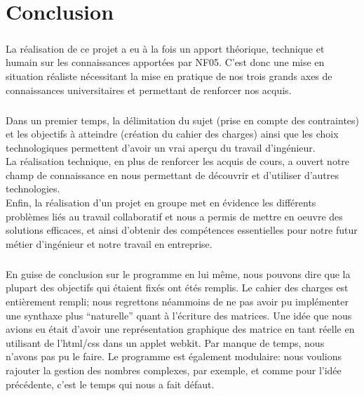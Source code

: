 \chapter{Conclusion}
    \paragraph{}
        La réalisation de ce projet a eu à la fois un apport théorique, technique et humain sur les connaissances apportées par NF05. C'est donc une mise en situation réaliste nécessitant la mise en pratique de nos trois grands axes de connaissances universitaires et permettant de renforcer nos acquis.

    \paragraph{}
        Dans un premier temps, la délimitation du sujet (prise en compte des contraintes) et les objectifs à atteindre (création du cahier des charges) ainsi que les choix technologiques permettent d'avoir un vrai aperçu du travail d'ingénieur.
        \\La réalisation technique, en plus de renforcer les acquis de cours, a ouvert notre champ de connaissance en nous permettant de découvrir et d'utiliser d'autres technologies.
        \\Enfin, la réalisation d'un projet en groupe met en évidence les différents problèmes liés au travail collaboratif et nous a permis de mettre en oeuvre des solutions efficaces, et ainsi d'obtenir des compétences essentielles pour notre futur métier d'ingénieur et notre travail en entreprise.

    \paragraph{}
        En guise de conclusion sur le programme en lui même, nous pouvons dire que la plupart des objectifs qui étaient fixés ont étés remplis. Le cahier des charges est entièrement rempli; nous regrettons néammoins de ne pas avoir pu implémenter une synthaxe plus ``naturelle'' quant à l'écriture des matrices. Une idée que nous avions eu était d'avoir une représentation graphique des matrice en tant réelle en utilisant de l'html/css dans un applet webkit. Par manque de temps, nous n'avons pas pu le faire. Le programme est également modulaire: nous voulions rajouter la gestion des nombres complexes, par exemple, et comme pour l'idée précédente, c'est le temps qui nous a fait défaut.
